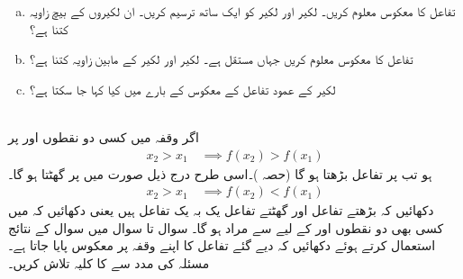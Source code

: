 \begin{enumerate}[a.]
\item
تفاعل  کا معکوس معلوم کریں۔ لکیر  اور لکیر  کو ایک ساتھ ترسیم کریں۔ ان لکیروں کے بیچ زاویہ کتنا ہے؟
\item
تفاعل  کا معکوس معلوم کریں جہاں  مستقل ہے۔ لکیر  اور لکیر  کے مابین زاویہ کتنا ہے؟
\item
لکیر  کے عمود تفاعل کے معکوس کے بارے میں کیا کہا جا سکتا ہے؟
\end{enumerate}
\\
اگر وقفہ  میں کسی دو نقطوں  اور  پر 
\begin{align*}
x_2>x_1\quad \implies f(x_2)>f(x_1)
\end{align*}
ہو تب  پر تفاعل  بڑھتا ہو گا (حصہ )۔اسی طرح  درج ذیل صورت میں  پر  گھٹتا ہو گا۔
\begin{align*}
x_2>x_1\quad \implies f(x_2)<f(x_1)
\end{align*}
دکھائیں کہ بڑھتے تفاعل اور گھٹتے تفاعل یک بہ یک تفاعل ہیں یعنی دکھائیں کہ  میں کسی بھی دو نقطوں  اور  کے لیے  سے مراد  ہو گا۔ 
سوال  تا سوال  میں سوال  کے نتائج استعمال کرتے ہوئے دکھائیں کہ دیے گئے  تفاعل کا اپنے وقفہ پر معکوس پایا جاتا ہے۔ مسئلہ  کی مدد سے  کا کلیہ تلاش کریں۔

